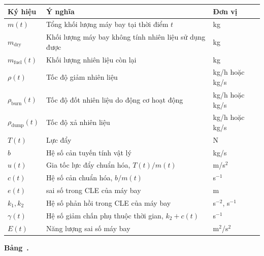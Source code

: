﻿\documentclass[12pt]{article}
\begin{document}
\begin{center}
\label{tab:fuel-notation}
\centering
\renewcommand{\arraystretch}{1.25}
\begin{tabular}{|>{\centering\arraybackslash}p{2.4cm}|>{\raggedright\arraybackslash}p{8.8cm}|>{\centering\arraybackslash}p{2.4cm}|}
\hline
\textbf{Ký hiệu} & \textbf{Ý nghĩa} & \textbf{Đơn vị} \\
\hline
$m(t)$ & Tổng khối lượng máy bay tại thời điểm $t$ & kg \\
\hline
$m_{\mathrm{dry}}$ & Khối lượng máy bay không tính nhiên liệu sử dụng được & kg \\
\hline
$m_{\mathrm{fuel}}(t)$ & Khối lượng nhiên liệu còn lại & kg \\
\hline
$\rho(t)$ & Tốc độ giảm nhiên liệu & kg/h hoặc kg/s \\
\hline
$\rho_{\mathrm{burn}}(t)$ & Tốc độ đốt nhiên liệu do động cơ hoạt động & kg/h hoặc kg/s \\
\hline
$\rho_{\mathrm{dump}}(t)$ & Tốc độ xả nhiên liệu & kg/h hoặc kg/s \\
\hline
$T(t)$ & Lực đẩy & N \\
\hline
$b$ & Hệ số cản tuyến tính vật lý & kg/s \\
\hline
$u(t)$ & Gia tốc lực đẩy chuẩn hóa, $T(t)/m(t)$ & m/s$^2$ \\
\hline
$c(t)$ & Hệ số cản chuẩn hóa, $b/m(t)$ & s$^{-1}$ \\
\hline
$e(t)$ & sai số trong CLE của máy bay & m \\
\hline
$k_1, k_2$ & Hệ số phản hồi trong CLE của máy bay & s$^{-2}$, s$^{-1}$ \\
\hline
$\gamma(t)$ & Hệ số giảm chấn phụ thuộc thời gian, $k_2 + c(t)$ & s$^{-1}$ \\
\hline
$E(t)$ & Năng lượng sai số máy bay & m$^2$/s$^2$ \\
\hline
\end{tabular}
\par\smallskip
\textbf{Bảng~\thetable.} 
\end{center}
\end{document}

